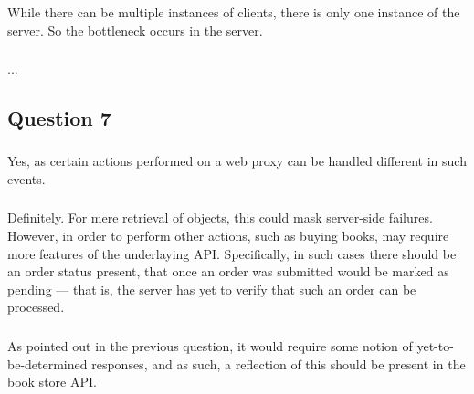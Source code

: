 \subsubsection{}
While there can be multiple instances of clients, there is only one instance of
the server. So the bottleneck occurs in the server.

\subsubsection{}
...

\subsection{Question 7}

\subsubsection{}
Yes, as certain actions performed on a web proxy can be handled different in
such events.

\subsubsection{}
Definitely. For mere retrieval of objects, this could mask server-side
failures. However, in order to perform other actions, such as buying books,
may require more features of the underlaying API. Specifically, in such cases
there should be an order status present, that once an order was submitted would
be marked as pending --- that is, the server has yet to verify that such an
order can be processed.

\subsubsection{}
As pointed out in the previous question, it would require some notion of
yet-to-be-determined responses, and as such, a reflection of this should be
present in the book store API.


